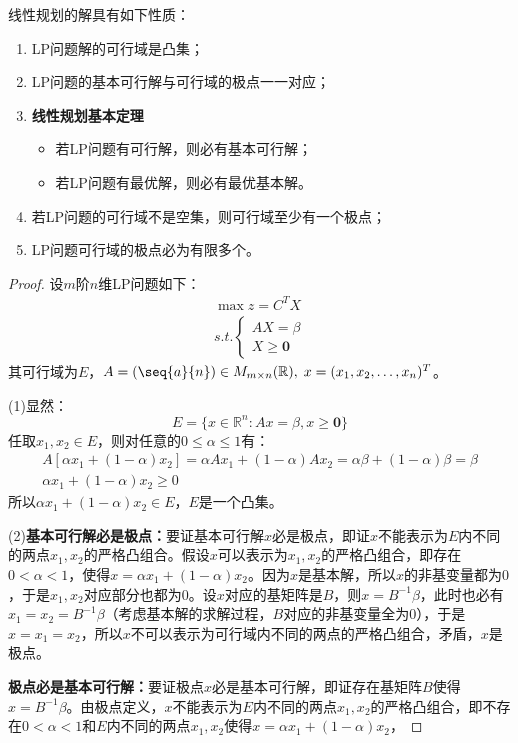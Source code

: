 \begin{property}
	线性规划的解具有如下性质：
	\begin{enumerate}
		\item LP问题解的可行域是凸集；
		\item LP问题的基本可行解与可行域的极点一一对应；
		\item \textbf{线性规划基本定理}
		\begin{itemize}
			\item 若LP问题有可行解，则必有基本可行解；
			\item 若LP问题有最优解，则必有最优基本解。
		\end{itemize}
		\item 若LP问题的可行域不是空集，则可行域至少有一个极点；
		\item LP问题可行域的极点必为有限多个。
	\end{enumerate}
\end{property}
\begin{proof}
	设$m$阶$n$维LP问题如下：
	\begin{gather*}
		\max z=C^TX \\
		s.t.
		\begin{cases}
			AX=\beta \\
			X\geqslant\mathbf{0}
		\end{cases}
	\end{gather*}
	其可行域为$E$，$A=(\seq{a}{n})\in M_{m\times n}(\mathbb{R}),\;x=(x_1,x_2,\dots,x_n)^T$。\par
	(1)显然：
	\begin{equation*}
		E=\{x\in\mathbb{R}^{n}:Ax=\beta,x\geqslant\mathbf{0}\}
	\end{equation*}
	任取$x_1,x_2\in E$，则对任意的$0\leqslant\alpha\leqslant1$有：
	\begin{gather*}
		A[\alpha x_1+(1-\alpha)x_2]=\alpha Ax_1+(1-\alpha)Ax_2=\alpha\beta+(1-\alpha)\beta=\beta \\
		\alpha x_1+(1-\alpha)x_2\geqslant0
	\end{gather*}
	所以$\alpha x_1+(1-\alpha)x_2\in E$，$E$是一个凸集。\par
	(2)\textbf{基本可行解必是极点：}要证基本可行解$x$必是极点，即证$x$不能表示为$E$内不同的两点$x_1,x_2$的严格凸组合。假设$x$可以表示为$x_1,x_2$的严格凸组合，即存在$0<\alpha<1$，使得$x=\alpha x_1+(1-\alpha)x_2$。因为$x$是基本解，所以$x$的非基变量都为$0$，于是$x_1,x_2$对应部分也都为$0$。设$x$对应的基矩阵是$B$，则$x=B^{-1}\beta$，此时也必有$x_1=x_2=B^{-1}\beta$（考虑基本解的求解过程，$B$对应的非基变量全为$0$），于是$x=x_1=x_2$，所以$x$不可以表示为可行域内不同的两点的严格凸组合，矛盾，$x$是极点。\par
	\textbf{极点必是基本可行解：}要证极点$x$必是基本可行解，即证存在基矩阵$B$使得$x=B^{-1}\beta$。由极点定义，$x$不能表示为$E$内不同的两点$x_1,x_2$的严格凸组合，即不存在$0<\alpha<1$和$E$内不同的两点$x_1,x_2$使得$x=\alpha x_1+(1-\alpha)x_2$，
\end{proof}